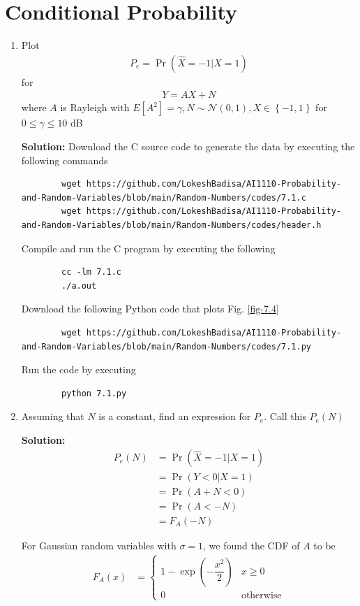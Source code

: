 \documentclass[journal,12pt,twocolumn]{IEEEtran}
\newcommand{\solution}{\noindent \textbf{Solution: }}
\providecommand{\pr}[1]{\ensuremath{\Pr\left(#1\right)}}
\providecommand{\brak}[1]{\ensuremath{\left(#1\right)}}
\providecommand{\cbrak}[1]{\ensuremath{\left\{#1\right\}}}
\providecommand{\sbrak}[1]{\ensuremath{\left[#1\right]}}
\providecommand{\gauss}[2]{\mathcal{N}\ensuremath{\left(#1,#2\right)}}
\numberwithin{equation}{section}
\renewcommand\thesection{\arabic{section}}
\begin{document}
	\section{Conditional Probability}
	\begin{enumerate}[label=\thesection.\arabic*,ref=\thesection.\theenumi]
	\item Plot 
	\begin{align}
		P_e = \pr{\hat{X} = -1|X=1}	
	\end{align}
	for 
	\begin{align}
		Y = AX+N
	\end{align}
	where $A$ is Rayleigh with $E\sbrak{A^2} = \gamma, N \sim \gauss{0}{1}, X \in \cbrak{-1,1}$ for $0 \le \gamma \le 10$ dB
	
	\solution Download the C source code to generate the data by executing the following commands
	\begin{lstlisting}
		wget https://github.com/LokeshBadisa/AI1110-Probability-and-Random-Variables/blob/main/Random-Numbers/codes/7.1.c
		wget https://github.com/LokeshBadisa/AI1110-Probability-and-Random-Variables/blob/main/Random-Numbers/codes/header.h
	\end{lstlisting}
	Compile and run the C program by executing the following
	\begin{lstlisting}
		cc -lm 7.1.c
		./a.out
	\end{lstlisting}
	
	Download the following Python code that plots Fig. \ref{fig-7.4} 
	\begin{lstlisting}
		wget https://github.com/LokeshBadisa/AI1110-Probability-and-Random-Variables/blob/main/Random-Numbers/codes/7.1.py
	\end{lstlisting}
	Run the code by executing
	\begin{lstlisting}
		python 7.1.py
	\end{lstlisting}
	
	\item Assuming that $N$ is a constant, find an expression for $P_e$.  Call this $P_e(N)$
	
	\solution 
	\begin{align}
		P_e(N) &= \pr{\hat{X} = -1|X = 1} \\
		&= \pr{Y<0|X=1} \\
		&= \pr{A+N<0} \\
		&= \pr{A<-N} \\
		&= F_A(-N)
	\end{align}
	
	For Gaussian random variables with $\sigma = 1$, we found the CDF of $A$ to be
	\begin{align}
		F_A(x) &= 
		\begin{cases}
			1 - \exp\brak{-\dfrac{x^2}{2}} & x \geq 0 \\
			0 & \text{otherwise}
		\end{cases}
	\end{align}
	

\end{enumerate}
\end{document}
